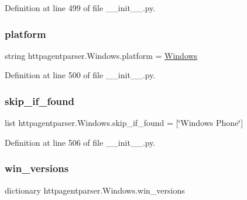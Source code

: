 Definition at line 499 of file \+\_\+\+\_\+init\+\_\+\+\_\+.\+py.

\hypertarget{classhttpagentparser_1_1_windows_a37cdb17921c22c582c5af558c7b3b951}{}\label{classhttpagentparser_1_1_windows_a37cdb17921c22c582c5af558c7b3b951} 
\subsubsection{\texorpdfstring{platform}{platform}}
{\footnotesize\ttfamily string httpagentparser.\+Windows.\+platform = \textquotesingle{}\hyperlink{classhttpagentparser_1_1_windows}{Windows}\textquotesingle{}\hspace{0.3cm}{\ttfamily [static]}}



Definition at line 500 of file \+\_\+\+\_\+init\+\_\+\+\_\+.\+py.

\hypertarget{classhttpagentparser_1_1_windows_adc13ce268b0ac1525c9ac8d7ad5f9561}{}\label{classhttpagentparser_1_1_windows_adc13ce268b0ac1525c9ac8d7ad5f9561} 
\subsubsection{\texorpdfstring{skip\+\_\+if\+\_\+found}{skip\_if\_found}}
{\footnotesize\ttfamily list httpagentparser.\+Windows.\+skip\+\_\+if\+\_\+found = \mbox{[}\char`\"{}Windows Phone\char`\"{}\mbox{]}\hspace{0.3cm}{\ttfamily [static]}}



Definition at line 506 of file \+\_\+\+\_\+init\+\_\+\+\_\+.\+py.

\hypertarget{classhttpagentparser_1_1_windows_a178576c8bc664b7a6714ca6af403587c}{}\label{classhttpagentparser_1_1_windows_a178576c8bc664b7a6714ca6af403587c} 
\subsubsection{\texorpdfstring{win\+\_\+versions}{win\_versions}}
{\footnotesize\ttfamily dictionary httpagentparser.\+Windows.\+win\+\_\+versions\hspace{0.3cm}{\ttfamily [static]}}

